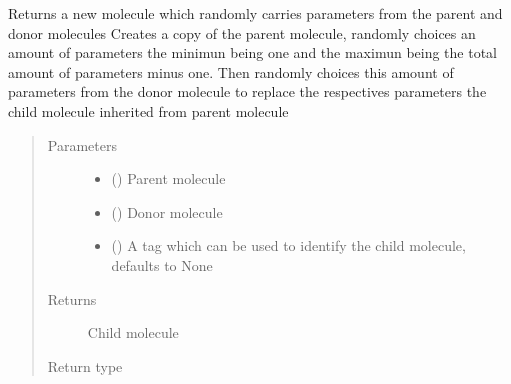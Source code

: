 \documentclass[letterpaper,10pt,english]{sphinxmanual}
\begin{document}
\begin{fulllineitems}
\label{\detokenize{molecular:molecular.crossover_n}}
\sphinxAtStartPar
Returns a new molecule which randomly carries parameters from the parent and donor molecules
Creates a copy of the parent molecule, randomly choices an amount of parameters the minimun being one and the
maximun being the total amount of parameters minus one. Then randomly choices this amount of parameters from the
donor molecule to replace the respectives parameters the child molecule inherited from parent molecule
\begin{quote}\begin{description}
\item[{Parameters}] \leavevmode\begin{itemize}
\item {} 
\sphinxAtStartPar
{} ({\hyperref[\detokenize{molecular:molecular.Molecule}]{}}) \textendash{} Parent molecule

\item {} 
\sphinxAtStartPar
{} ({\hyperref[\detokenize{molecular:molecular.Molecule}]{}}) \textendash{} Donor molecule

\item {} 
\sphinxAtStartPar
{} (\sphinxstyleliteralemphasis{\sphinxupquote{, }}) \textendash{} A tag which can be used to identify the child molecule, defaults to None

\end{itemize}

\item[{Returns}] \leavevmode
\sphinxAtStartPar
Child molecule

\item[{Return type}] \leavevmode
\sphinxAtStartPar
{\hyperref[\detokenize{molecular:molecular.Molecule}]{}}

\end{description}\end{quote}

\end{fulllineitems}
\end{document}
